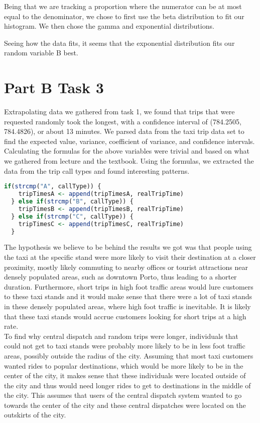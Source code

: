 \documentclass{article}
\begin{document}
Being that we are tracking a proportion where the numerator can be at most equal to the denominator, we chose to first use the beta distribution to fit our histogram. We then chose the gamma and exponential distributions. 





Seeing how the data fits, it seems that the exponential distribution fits our random variable B best.
\section{Part B Task 3}

\indent Extrapolating data we gathered from task 1, we found that trips that were requested randomly took the longest, with a confidence interval of (784.2505, 784.4826), or about 13 minutes. We parsed data from the taxi trip data set to find the expected value, variance, coefficient of variance, and confidence intervals. Calculating the formulas for the above variables were trivial and based on what we gathered from lecture and the textbook. Using the formulas, we extracted the data from the trip call types and found interesting patterns. \\
\begin{lstlisting}[language=R]
if(strcmp("A", callType)) {
    tripTimesA <- append(tripTimesA, realTripTime)
  } else if(strcmp("B", callType)) {
    tripTimesB <- append(tripTimesB, realTripTime)
  } else if(strcmp("C", callType)) {
    tripTimesC <- append(tripTimesC, realTripTime)
  }
\end{lstlisting}

\indent The hypothesis we believe to be behind the results we got was that people using the taxi at the specific stand were more likely to visit their destination at a closer proximity, mostly likely commuting to nearby offices or tourist attractions near densely populated areas, such as downtown Porto, thus leading to a shorter duration. Furthermore, short trips in high foot traffic areas would lure customers to these taxi stands and it would make sense that there were a lot of taxi stands in these densely populated areas, where high foot traffic is inevitable. It is likely that these taxi stands would accrue customers looking for short trips at a high rate.\\
\indent To find why central dispatch and random trips were longer, individuals that could not get to taxi stands were probably more likely to be in less foot traffic areas, possibly outside the radius of the city. Assuming that most taxi customers wanted rides to popular destinations, which would be more likely to be in the center of the city, it makes sense that these individuals were located outside of the city and thus would need longer rides to get to destinations in the middle of the city. This assumes that users of the central dispatch system wanted to go towards the center of the city and these central dispatches were located on the outskirts of the city. 
\end{document}
